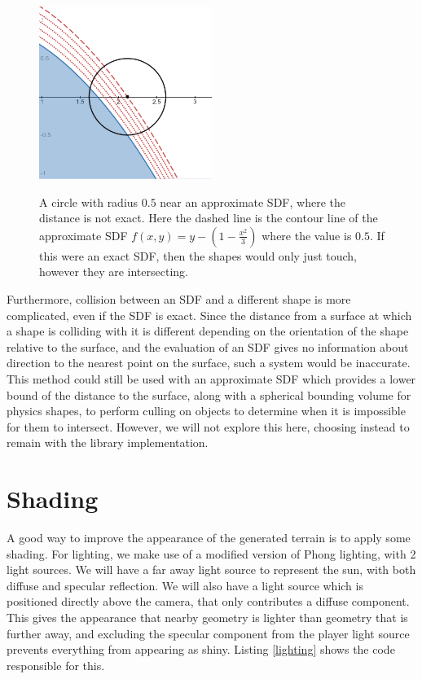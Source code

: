 \documentclass[11pt]{article}
\begin{document}
\begin{figure}
  \caption{A circle with radius $0.5$ near an approximate SDF, where the distance is not exact. Here the dashed line is the contour line of the approximate SDF $f\left(x,y\right) = y - \left(1 - \frac{x^2}{3}\right)$ where the value is $0.5$. If this were an exact SDF, then the shapes would only just touch, however they are intersecting.}
  \includegraphics[width=0.5\textwidth]{approx_collision}
  \label{fig:approx_collision}
\end{figure}

Furthermore, collision between an SDF and a different shape is more complicated, even if the SDF is exact. Since the distance from a surface at which a shape is colliding with it is different depending on the orientation of the shape relative to the surface, and the evaluation of an SDF gives no information about direction to the nearest point on the surface, such a system would be inaccurate. This method could still be used with an approximate SDF which provides a lower bound of the distance to the surface, along with a spherical bounding volume for physics shapes, to perform culling on objects to determine when it is impossible for them to intersect. However, we will not explore this here, choosing instead to remain with the library implementation.  

\section{Shading}
A good way to improve the appearance of the generated terrain is to apply some shading. For lighting, we make use of a modified version of Phong lighting, with 2 light sources. We will have a far away light source to represent the sun, with both diffuse and specular reflection. We will also have a light source which is positioned directly above the camera, that only contributes a diffuse component. This gives the appearance that nearby geometry is lighter than geometry that is further away, and excluding the specular component from the player light source prevents everything from appearing as shiny. Listing \ref{lighting} shows the code responsible for this.
\end{document}
